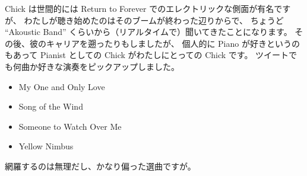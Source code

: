\documentclass[dvipdfmx,autodetect-engine,10pt,b5paper,papersize,openany,dvipsnames]{jsbook}
\begin{document}
\begin{multicols}{2}

\vspace{9cm}

Chick は世間的には Return to Forever でのエレクトリックな側面が有名ですが、
わたしが聴き始めたのはそのブームが終わった辺りからで、
ちょうど ``Akoustic Band'' くらいから（リアルタイムで）聞いてきたことになります。
その後、彼のキャリアを遡ったりもしましたが、
個人的に Piano が好きというのもあって
Pianist としての Chick がわたしにとっての Chick です。
ツイートでも何曲か好きな演奏をピックアップしました。
\begin{itemize}
\item My One and Only Love
\item Song of the Wind
\item Someone to Watch Over Me
\item Yellow Nimbus
\end{itemize}
網羅するのは無理だし、かなり偏った選曲ですが。



\end{multicols}
\end{document}
